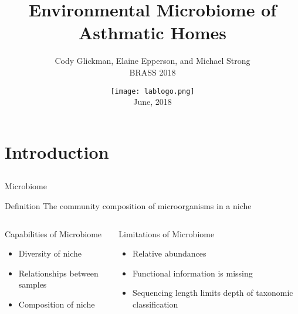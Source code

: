 \documentclass[11pt]{beamer}
\author{Cody Glickman, Elaine Epperson, and Michael Strong \\ BRASS 2018}
\title{Environmental Microbiome of Asthmatic Homes}
\date{ \texttt{[image: lablogo.png]} \\ June, 2018}
\begin{document}
	\maketitle


	
\section{Introduction}
\subsection{}

	\begin{frame}{Microbiome}
		\begin{block}{Definition}
		The community composition of microorganisms in a niche
		\end{block}
		
		\begin{columns}
		\begin{block}{Capabilities of Microbiome}
		\begin{itemize}
		\item Diversity of niche
		\item Relationships between samples
		\item Composition of niche
		\end{itemize}
		\end{block}
		
		\begin{block}{Limitations of Microbiome}
		\begin{itemize}
		\item Relative abundances
		\item Functional information is missing
		\item Sequencing length limits depth of taxonomic classification

		\end{itemize}
		\end{block}
		
		\end{columns}
	
	\end{frame}
	
\end{document}
